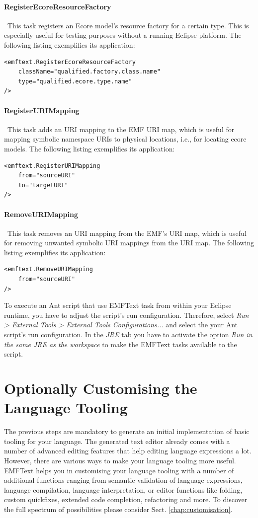 	\paragraph*{RegisterEcoreResourceFactory}~This task registers an Ecore
	model's resource factory for a certain type. This is especially useful for testing
	purposes without a running Eclipse platform.  
	The following listing exemplifies its application:
\begin{lstlisting}
<emftext.RegisterEcoreResourceFactory
	className="qualified.factory.class.name"
	type="qualified.ecore.type.name"
/>
\end{lstlisting}
	\paragraph*{RegisterURIMapping}~This task adds an URI mapping to the EMF URI
	map, which is useful for mapping symbolic namespace URIs to physical locations, i.e., 
	for locating ecore models. 
	The following listing exemplifies its application:
\begin{lstlisting}
<emftext.RegisterURIMapping
	from="sourceURI"
	to="targetURI"
/>
\end{lstlisting}

\paragraph*{RemoveURIMapping}~This task removes an URI mapping from the EMF's
URI map, which is useful for removing unwanted symbolic URI mappings from the URI map. 
The following listing exemplifies its application: 
\begin{lstlisting}
<emftext.RemoveURIMapping
	from="sourceURI"
/>
\end{lstlisting}
	
	
	To execute an Ant script that use EMFText task from within your Eclipse
	runtime, you have to adjust the script's run configuration. Therefore, select 
	\emph{Run > External Tools > External Tools Configurations...} and select the
	your Ant script's run configuration. In the \emph{JRE} tab you have to
	activate the option \emph{Run in the same JRE as the workspace} to make the
	EMFText tasks available to the script.
	
\section{Optionally Customising the Language Tooling}

The previous steps are mandatory to generate an initial implementation of
basic tooling for your language. The generated text editor already
comes with a number of advanced editing features that help editing language
expressions a lot. However, there are various ways to make your language tooling
more useful. EMFText helps you in customising your language tooling with a
number of additional functions ranging from semantic validation of language
expressions, language compilation, language interpretation, or editor functions
like folding, custom quickfixes, extended code completion, refactoring and more.
To discover the full spectrum of possibilities please consider Sect.
\ref{chap:customisation}.
